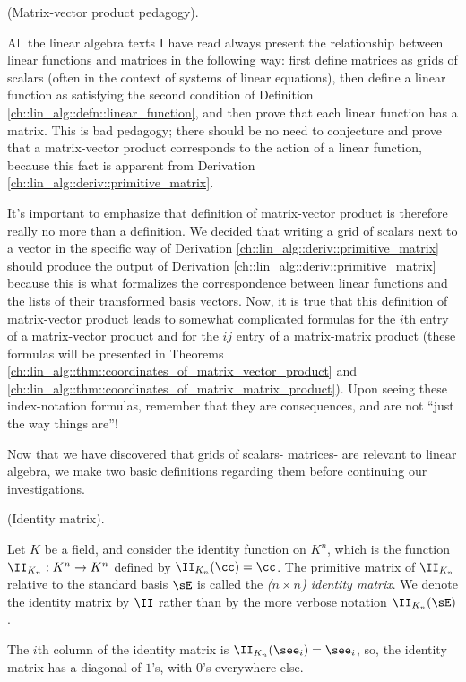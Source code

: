 \begin{remark}
    (Matrix-vector product pedagogy). 
    
    All the linear algebra texts I have read always present the relationship between linear functions and matrices in the following way: first define matrices as grids of scalars (often in the context of systems of linear equations), then define a linear function as satisfying the second condition of Definition \ref{ch::lin_alg::defn::linear_function}, and then prove that each linear function has a matrix. This is bad pedagogy; there should be no need to conjecture and prove that a matrix-vector product corresponds to the action of a linear function, because this fact is apparent from Derivation \ref{ch::lin_alg::deriv::primitive_matrix}.
    
    It's important to emphasize that definition of matrix-vector product is therefore really no more than a definition. We decided that writing a grid of scalars next to a vector in the specific way of Derivation \ref{ch::lin_alg::deriv::primitive_matrix} should produce the output of Derivation \ref{ch::lin_alg::deriv::primitive_matrix} because this is what formalizes the correspondence between linear functions and the lists of their transformed basis vectors. Now, it is true that this definition of matrix-vector product leads to somewhat complicated formulas for the $i$th entry of a matrix-vector product and for the $ij$ entry of a matrix-matrix product (these formulas will be presented in Theorems \ref{ch::lin_alg::thm::coordinates_of_matrix_vector_product} and \ref{ch::lin_alg::thm::coordinates_of_matrix_matrix_product}). Upon seeing these index-notation formulas, remember that they are consequences, and are not ``just the way things are''!
\end{remark}

Now that we have discovered that grids of scalars- matrices- are relevant to linear algebra, we make two basic definitions regarding them before continuing our investigations.

\begin{defn}
    (Identity matrix).
    
    Let $K$ be a field, and consider the identity function on $K^n$, which is the function $\II_{K_n}:K^n \rightarrow K^n$ defined by $\II_{K_n}(\cc) = \cc$. The primitive matrix of $\II_{K_n}$ relative to the standard basis $\sE$ is called the \textit{($n \times n$) identity matrix}. We denote the identity matrix by $\II$ rather than by the more verbose notation $\II_{K_n}(\sE)$.
    
    The $i$th column of the identity matrix is $\II_{K_n}(\see_i) = \see_i$, so, the identity matrix has a diagonal of $1$'s, with $0$'s everywhere else.
\end{defn}

